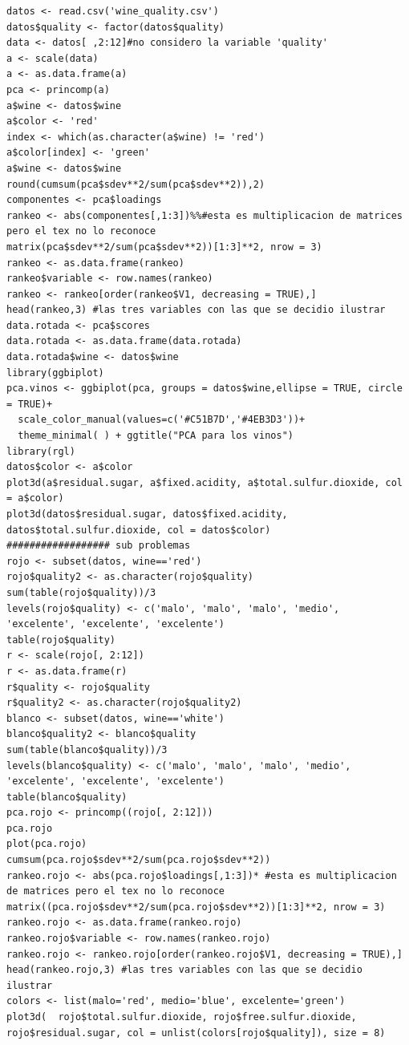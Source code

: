 \documentclass[paper=letter, fontsize=11pt]{scrartcl}
\numberwithin{equation}{section} %
\numberwithin{figure}{section} %
\numberwithin{table}{section} %
\begin{document}
\begin{lstlisting}[style=customc,basicstyle=\scriptsize]
datos <- read.csv('wine_quality.csv')
datos$quality <- factor(datos$quality)
data <- datos[ ,2:12]#no considero la variable 'quality'
a <- scale(data)
a <- as.data.frame(a)
pca <- princomp(a)
a$wine <- datos$wine
a$color <- 'red'
index <- which(as.character(a$wine) != 'red') 
a$color[index] <- 'green'
a$wine <- datos$wine
round(cumsum(pca$sdev**2/sum(pca$sdev**2)),2)
componentes <- pca$loadings
rankeo <- abs(componentes[,1:3])%%#esta es multiplicacion de matrices pero el tex no lo reconoce
matrix(pca$sdev**2/sum(pca$sdev**2))[1:3]**2, nrow = 3)
rankeo <- as.data.frame(rankeo)
rankeo$variable <- row.names(rankeo)
rankeo <- rankeo[order(rankeo$V1, decreasing = TRUE),]
head(rankeo,3) #las tres variables con las que se decidio ilustrar 
data.rotada <- pca$scores
data.rotada <- as.data.frame(data.rotada)
data.rotada$wine <- datos$wine
library(ggbiplot)
pca.vinos <- ggbiplot(pca, groups = datos$wine,ellipse = TRUE, circle = TRUE)+
  scale_color_manual(values=c('#C51B7D','#4EB3D3'))+
  theme_minimal( ) + ggtitle("PCA para los vinos")
library(rgl)
datos$color <- a$color
plot3d(a$residual.sugar, a$fixed.acidity, a$total.sulfur.dioxide, col = a$color)
plot3d(datos$residual.sugar, datos$fixed.acidity, datos$total.sulfur.dioxide, col = datos$color)
################## sub problemas 
rojo <- subset(datos, wine=='red')
rojo$quality2 <- as.character(rojo$quality)
sum(table(rojo$quality))/3
levels(rojo$quality) <- c('malo', 'malo', 'malo', 'medio', 'excelente', 'excelente', 'excelente')
table(rojo$quality)
r <- scale(rojo[, 2:12])
r <- as.data.frame(r)
r$quality <- rojo$quality
r$quality2 <- as.character(rojo$quality2)
blanco <- subset(datos, wine=='white')
blanco$quality2 <- blanco$quality
sum(table(blanco$quality))/3
levels(blanco$quality) <- c('malo', 'malo', 'malo', 'medio', 'excelente', 'excelente', 'excelente')
table(blanco$quality)
pca.rojo <- princomp((rojo[, 2:12]))
pca.rojo
plot(pca.rojo)
cumsum(pca.rojo$sdev**2/sum(pca.rojo$sdev**2))
rankeo.rojo <- abs(pca.rojo$loadings[,1:3])* #esta es multiplicacion de matrices pero el tex no lo reconoce matrix((pca.rojo$sdev**2/sum(pca.rojo$sdev**2))[1:3]**2, nrow = 3)
rankeo.rojo <- as.data.frame(rankeo.rojo)
rankeo.rojo$variable <- row.names(rankeo.rojo)
rankeo.rojo <- rankeo.rojo[order(rankeo.rojo$V1, decreasing = TRUE),]
head(rankeo.rojo,3) #las tres variables con las que se decidio ilustrar
colors <- list(malo='red', medio='blue', excelente='green')
plot3d(  rojo$total.sulfur.dioxide, rojo$free.sulfur.dioxide, rojo$residual.sugar, col = unlist(colors[rojo$quality]), size = 8)

\end{lstlisting}
\end{document}
